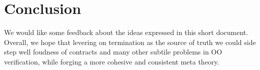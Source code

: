 \documentclass[runningheads]{llncs}
\begin{document}
\section{Conclusion}
We would like some feedback about the ideas expressed in this short document.
Overall, we hope that levering on termination as the source of truth we could side step well foudness of contracts and many other subtile problems in OO verification, while forging a more cohesive and consistent meta theory.
\end{document}
